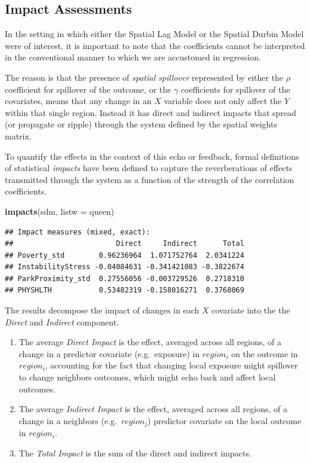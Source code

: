 \documentclass[
]{book}
\newenvironment{Shaded}{\begin{snugshade}}{\end{snugshade}}
\newcommand{\AttributeTok}[1]{\textcolor[rgb]{0.13,0.29,0.53}{#1}}
\newcommand{\FunctionTok}[1]{\textcolor[rgb]{0.13,0.29,0.53}{\textbf{#1}}}
\newcommand{\NormalTok}[1]{#1}
\providecommand{\tightlist}{%
  \setlength{\itemsep}{0pt}\setlength{\parskip}{0pt}}
\begin{document}
\hypertarget{impact-assessments}{%
\subsection{Impact Assessments}\label{impact-assessments}}

In the setting in which either the Spatial Lag Model or the Spatial Durbin Model were of interest, it is important to note that the coefficients cannot be interpreted in the conventional manner to which we are accustomed in regression.

The reason is that the presence of \emph{spatial spillover} represented by either the \(\rho\) coefficient for spillover of the outcome, or the \(\gamma\) coefficients for spillover of the covariates, means that any change in an \(X\) variable does not only affect the \(Y\) within that single region. Instead it has direct and indirect impacts that spread (or propagate or ripple) through the system defined by the spatial weights matrix.

To quantify the effects in the context of this echo or feedback, formal definitions of statistical \emph{impacts} have been defined to capture the reverberations of effects transmitted through the system as a function of the strength of the correlation coefficients.

\begin{Shaded}
\begin{Highlighting}[]
\FunctionTok{impacts}\NormalTok{(sdm, }\AttributeTok{listw =}\NormalTok{ queen)}
\end{Highlighting}
\end{Shaded}

\begin{verbatim}
## Impact measures (mixed, exact):
##                        Direct     Indirect      Total
## Poverty_std        0.96236964  1.071752764  2.0341224
## InstabilityStress -0.04084631 -0.341421083 -0.3822674
## ParkProximity_std  0.27556056 -0.003729526  0.2718310
## PHYSHLTH           0.53482319 -0.158016271  0.3768069
\end{verbatim}

The results decompose the impact of changes in each \(X\) covariate into the the \emph{Direct} and \emph{Indirect} component.

\begin{enumerate}
\def\labelenumi{\arabic{enumi}.}
\tightlist
\item
  The average \emph{Direct Impact} is the effect, averaged across all regions, of a change in a predictor covariate (e.g.~exposure) in \(region_i\) on the outcome in \(region_i\), accounting for the fact that changing local exposure might spillover to change neighbors outcomes, which might echo back and affect local outcomes.
\item
  The average \emph{Indirect Impact} is the effect, averaged across all regions, of a change in a neighbors (e.g.~\(region_j\)) predictor covariate on the local outcome in \(region_i\).
\item
  The \emph{Total Impact} is the sum of the direct and indirect impacts.
\end{enumerate}
\end{document}
